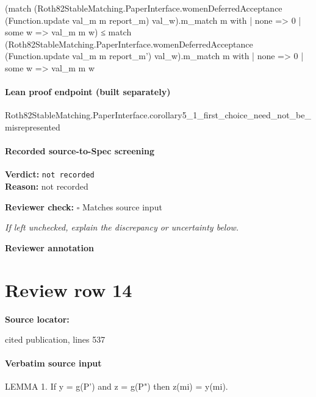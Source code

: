 \documentclass[10pt]{article}
\newcommand{\reviewerbox}{%
  \par\noindent\fbox{\parbox{0.96\linewidth}{\rule{0pt}{0.38in}}}\par
}
\newcommand{\reviewmatch}[1]{%
  \par\noindent\textbf{Reviewer check:} $\square$\; #1\par
  \noindent\emph{If left unchecked, explain the discrepancy or uncertainty below.}\par
}
\begin{document}
\begin{ReviewVerbatim}
                      (match
                          (Roth82StableMatching.PaperInterface.womenDeferredAcceptance
                                (Function.update val_m m report_m) val_w).m_match
                            m with
                        | none => 0
                        | some w => val_m m w) ≤
                        match
                          (Roth82StableMatching.PaperInterface.womenDeferredAcceptance
                                (Function.update val_m m report_m') val_w).m_match
                            m with
                        | none => 0
                        | some w => val_m m w
\end{ReviewVerbatim}

\paragraph{Lean proof endpoint (built separately)}\begin{ReviewVerbatim}
Roth82StableMatching.PaperInterface.corollary5_1_first_choice_need_not_be_misrepresented
\end{ReviewVerbatim}

\paragraph{Recorded source-to-Spec screening}
\textbf{Verdict:} \texttt{not recorded}
\\
\textbf{Reason:} not recorded
\reviewmatch{Matches source input}
\noindent\textbf{Reviewer annotation}\par
\reviewerbox
\clearpage
\hypertarget{source-claim-f2c197ac0692ce06}{}
\section*{Review row 14}
\textbf{Source locator:} {\footnotesize\raggedright cited publication, lines 537\par}
\paragraph{Verbatim source input}
\begin{ReviewVerbatim}
LEMMA 1. If y = g(P') and z = g(P") then z(mi) = y(mi).
\end{ReviewVerbatim}
\end{document}
